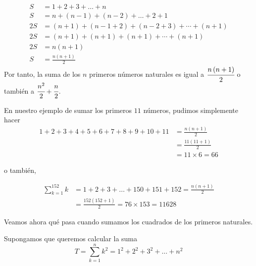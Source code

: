 \begin{align*}
S&=1+2+3+\ldots +n \\
S&=n+\left( n-1\right) +\left( n-2\right) +\ldots +2+1\\
2S&=\left( n+1\right) +\left( n-1+2\right) +\left( n-2+3\right) +\cdots +\left(n+1\right)\\
2S&=\left( n+1\right) +\left( n+1\right) +\left( n+1\right) +\cdots +\left(
n+1\right)\\
2S&=n\left( n+1\right)\\
S&=\frac{n\left( n+1\right) }{2}
\end{align*}
Por tanto, la suma de los $n$ primeros números naturales es igual a {\footnotesize $\cfrac{n\left( n+1\right) }{2}$} o también a {\footnotesize $\cfrac{n^2}{2}+\cfrac{n}{2}$.} 

En nuestro ejemplo de sumar los primeros $11$ números, pudimos simplemente hacer
{\small
\begin{align*}
1+2+3+4+5+6+7+8+9+10+11&=\frac{n\left( n+1\right) }{2}\\
&=\frac{11\left(11+1\right) }{2}\\
&=11\times 6=66
\end{align*}
}


o también,

{\footnotesize
\begin{align*}
\sum_{k=1}^{152} k&=1+2+3+\ldots+150+151+152=\frac{n\left( n+1\right) }{2}\\
&=\frac{152\left(152+1\right)}{2}=76\times 153=11628
\end{align*}
}

Veamos ahora qué pasa cuando sumamos los cuadrados de los primeros naturales.

\begin{ejemplo}
\textnormal {Supongamos que queremos calcular la suma}
\[
T=\sum_{k=1}^{n}k^{2}=1^{2}+2^{2}+3^{2}+\ldots +n^{2}
\]
\end{ejemplo}

